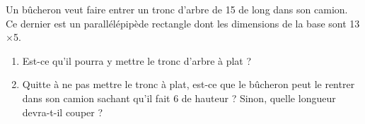 
\begin{exercice}[\ldots/6]\label{exosmath-0597}

    Un bûcheron veut faire entrer un tronc d'arbre de \unit{15}{\meter} de long dans son camion. Ce dernier est un parallélépipède rectangle dont les dimensions de la base sont \unit{13}{\meter}$\times$\unit{5}{\meter}.

    \begin{enumerate}
        \item
            Est-ce qu'il pourra y mettre le tronc d'arbre à plat ?
        \item
            Quitte à ne pas mettre le tronc à plat, est-ce que le bûcheron peut le rentrer dans son camion sachant qu'il fait \unit{6}{\meter} de hauteur ? Sinon, quelle longueur devra-t-il couper ?
    \end{enumerate}

\end{exercice}
